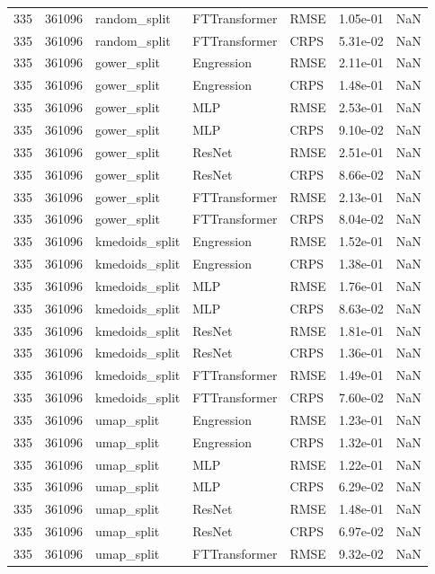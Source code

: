 \begin{tabular}{rrlllrr}
335 & 361096 & random\_split & FTTransformer & RMSE & 1.05e-01 & NaN \\
335 & 361096 & random\_split & FTTransformer & CRPS & 5.31e-02 & NaN \\
335 & 361096 & gower\_split & Engression & RMSE & 2.11e-01 & NaN \\
335 & 361096 & gower\_split & Engression & CRPS & 1.48e-01 & NaN \\
335 & 361096 & gower\_split & MLP & RMSE & 2.53e-01 & NaN \\
335 & 361096 & gower\_split & MLP & CRPS & 9.10e-02 & NaN \\
335 & 361096 & gower\_split & ResNet & RMSE & 2.51e-01 & NaN \\
335 & 361096 & gower\_split & ResNet & CRPS & 8.66e-02 & NaN \\
335 & 361096 & gower\_split & FTTransformer & RMSE & 2.13e-01 & NaN \\
335 & 361096 & gower\_split & FTTransformer & CRPS & 8.04e-02 & NaN \\
335 & 361096 & kmedoids\_split & Engression & RMSE & 1.52e-01 & NaN \\
335 & 361096 & kmedoids\_split & Engression & CRPS & 1.38e-01 & NaN \\
335 & 361096 & kmedoids\_split & MLP & RMSE & 1.76e-01 & NaN \\
335 & 361096 & kmedoids\_split & MLP & CRPS & 8.63e-02 & NaN \\
335 & 361096 & kmedoids\_split & ResNet & RMSE & 1.81e-01 & NaN \\
335 & 361096 & kmedoids\_split & ResNet & CRPS & 1.36e-01 & NaN \\
335 & 361096 & kmedoids\_split & FTTransformer & RMSE & 1.49e-01 & NaN \\
335 & 361096 & kmedoids\_split & FTTransformer & CRPS & 7.60e-02 & NaN \\
335 & 361096 & umap\_split & Engression & RMSE & 1.23e-01 & NaN \\
335 & 361096 & umap\_split & Engression & CRPS & 1.32e-01 & NaN \\
335 & 361096 & umap\_split & MLP & RMSE & 1.22e-01 & NaN \\
335 & 361096 & umap\_split & MLP & CRPS & 6.29e-02 & NaN \\
335 & 361096 & umap\_split & ResNet & RMSE & 1.48e-01 & NaN \\
335 & 361096 & umap\_split & ResNet & CRPS & 6.97e-02 & NaN \\
335 & 361096 & umap\_split & FTTransformer & RMSE & 9.32e-02 & NaN \\

\end{tabular}
